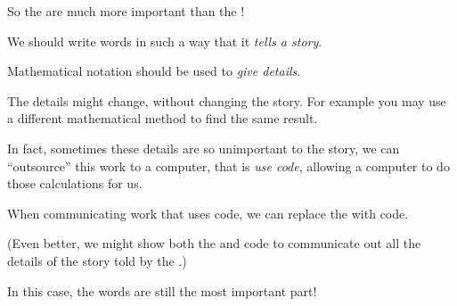 \documentclass[12pt]{article}
\begin{document}
\vspace{15mm}

\begin{center}

\end{center}

\vspace{15mm}

So the  are much more important than the !

\newpage


\begin{mdframed}[linewidth=0.5mm, backgroundcolor=orange!10]
We should write words in such a way that it \textit{tells a story}.
\end{mdframed}

\vspace{5mm}

\begin{mdframed}[linewidth=0.5mm, backgroundcolor=cyan!10]
Mathematical notation should be used to \textit{give details}.
\end{mdframed}

\vspace{5mm}

The details might change, without changing the story. For example you may use a different mathematical method to find the same result.

In fact, sometimes these details are so unimportant to the story, we can ``outsource'' this work to a computer, that is \textit{use code}, allowing a computer to do those calculations for us.

\vspace{5mm}

\begin{mdframed}[linewidth=0.5mm, backgroundcolor=codebg]
When communicating work that uses code, we can replace the  with code.

\vspace{5mm}

(Even better, we might show both the  and code to communicate out all the details of the story told by the .)
\end{mdframed}

\vspace{5mm}

In this case, the words are still the most important part!
\end{document}
